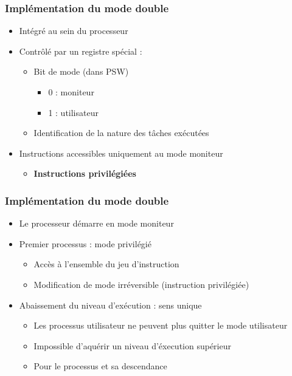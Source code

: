 \begin{frame}
 \frametitle{Implémentation du mode double}
 \begin{itemize}
 \item Intégré au sein du processeur
 \item Contrôlé par un registre spécial :
\begin{itemize}
\item Bit de mode (dans PSW)
\begin{itemize}
\item 0 : moniteur
\item 1 : utilisateur
\end{itemize}
\item Identification de la nature des tâches exécutées
\end{itemize}
\item Instructions accessibles uniquement au mode moniteur
\begin{itemize}
\item \textbf{Instructions privilégiées}
\end{itemize}
 \end{itemize}
\end{frame}


\begin{frame}
 \frametitle{Implémentation du mode double}
 \begin{itemize}
 \item Le processeur démarre en mode moniteur
 \item Premier processus : mode privilégié
 \begin{itemize}
 \item Accès à l'ensemble du jeu d'instruction
 \item Modification de mode irréversible (instruction privilégiée)
 \end{itemize}
 \item Abaissement du niveau d'exécution : sens unique
  \begin{itemize}
 \item Les processus utilisateur ne peuvent plus quitter le mode utilisateur
 \item Impossible d'aquérir un niveau d'éxecution supérieur
 \item Pour le processus et sa descendance
\end{itemize}
\end{itemize}
\end{frame}


